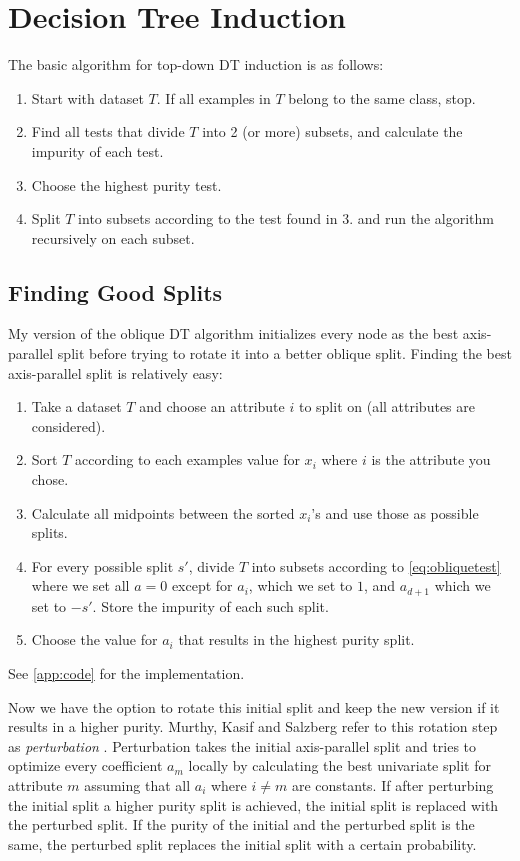 \documentclass[12pt]{article}
\begin{document}
\section{Decision Tree Induction}
The basic algorithm for top-down DT induction is as follows:
\begin{enumerate}
\item Start with dataset $T$. If all examples in $T$ belong to the same class, stop.
\item Find all tests that divide $T$ into 2 (or more) subsets, and calculate the impurity of each test.
\item Choose the highest purity test.
\item Split $T$ into subsets according to the test found in $3.$ and run the algorithm recursively on each subset.
\end{enumerate}

\subsection{Finding Good Splits}
My version of the oblique DT algorithm initializes every node as the best axis-parallel split before trying to rotate it into a better oblique split. Finding the best axis-parallel split is relatively easy:
\begin{enumerate}
\item Take a dataset $T$ and choose an attribute $i$ to split on (all attributes are considered).
\item Sort $T$ according to each examples value for $x_i$ where $i$ is the attribute you chose.
\item Calculate all midpoints between the sorted $x_i$'s and use those as possible splits.
\item For every possible split $s'$, divide $T$ into subsets according to \cref{eq:obliquetest} where we set all $a = 0$ except for $a_i$, which we set to $1$, and $a_{d+1}$ which we set to $-s'$. Store the impurity of each such split.
\item Choose the value for $a_i$ that results in the highest purity split.
\end{enumerate}

See \cref{app:code} for the implementation.

Now we have the option to rotate this initial split and keep the new version if it results in a higher purity. Murthy, Kasif and Salzberg refer to this rotation step as \emph{perturbation} \cite{KSM:1994}. Perturbation takes the initial axis-parallel split and tries to optimize every coefficient $a_m$ locally by calculating the best univariate split for attribute $m$ assuming that all $a_i$ where $i \neq m$ are constants. If after perturbing the initial split a higher purity split is achieved, the initial split is replaced with the perturbed split. If the purity of the initial and the perturbed split is the same, the perturbed split replaces the initial split with a certain probability.
\end{document}
